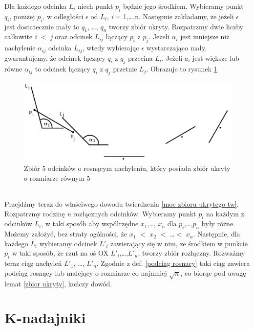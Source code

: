 \documentclass[brudnopis]{xmgr}
\begin{document}
Dla każdego odcinka $L_i$ niech punkt $p_i$ będzie jego środkiem. Wybieramy punkt $q_i$, poniżej $p_i$, w odległości $\epsilon$ od $L_i$, \textit{i} = 1,\ldots,n. Następnie zakładamy, że jeżeli $\epsilon$ jest dostatecznie mały to $q_1$, \ldots, $q_n$ tworzy zbiór ukryty. Rozpatrzmy dwie liczby całkowite \textit{i} $<$ \textit{j} oraz odcinek $L_{ij}$ łączący $p_i$ z $p_j$. Jeżeli $\alpha_i$ jest mniejsze niż nachylenie $\alpha_{ij}$ odcinka $L_{ij}$, wtedy wybierając $\epsilon$ wystarczająco mały, gwarantujemy, że odcinek łączący $q_i$ z $q_j$ przecina $L_i$. Jeżeli $a_i$ jest większe lub równe $\alpha_{ij}$ to odcinek łączący $q_i$ z $q_j$ przetnie $L_j$. Obrazuje to rysunek \ref{fig:5 zbior ukryty}
\begin{figure}[ht!]
  \centering
   \includegraphics{rysunki/5_odcinkow_zbior_ukryty.png}
   \caption{Zbiór 5 odcinków o rosnącym nachyleniu, który posiada zbiór ukryty o rozmiarze równym 5}
   \label{fig:5 zbior ukryty}
\end{figure}
\\Przejdźmy teraz do właściwego dowodu twierdzenia \ref{moc zbioru ukrytego tw}.
\\Rozpatrzmy rodzinę \textit{n} rozłącznych odcinków. Wybieramy punkt $p_i$ na każdym z odcinków $L_i$, w taki sposób aby współrzędne $x_1$,\ldots, $x_n$ dla $p_i$,\ldots,$p_n$ były różne. Możemy założyć, bez straty ogólności, że $x_1$ $<$ $x_2$ $<$ \ldots $<$ $x_n$. Następnie, dla każdego $L_i$ wybieramy odcinek $L'_i$ zawierający się w nim, ze środkiem w punkcie $p_i$ w taki sposób, że rzut na oś OX $L'_i$,\ldots,$L'_n$, tworzy zbiór rozłączny. Rozważmy teraz ciąg nachyleń $L'_1$, \ldots, $L'_n$. Zgodnie z def. \ref{podciag rosnacy} taki ciąg zawiera podciąg rosnący lub malejący o rozmiarze co najmniej $\sqrt{n}$, co biorąc pod uwagę lemat \ref{zbior ukryty}, kończy dowód.

\chapter{K-nadajniki}
\end{document}
